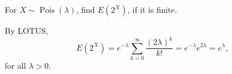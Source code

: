 
\setcounter{theorem}{61}
\begin{exercise} [BH.4.62] For $X \sim \operatorname{Pois}(\lambda)$, find $E\left(2^X\right)$, if it is finite.  
\begin{solution}
    By LOTUS,
    $$
    E\left(2^X\right)=e^{-\lambda} \sum_{k=0}^{\infty} \frac{(2 \lambda)^k}{k !}=e^{-\lambda} e^{2 \lambda}=e^\lambda,
    $$
    for all $\lambda>0$.
\end{solution}
\end{exercise}

